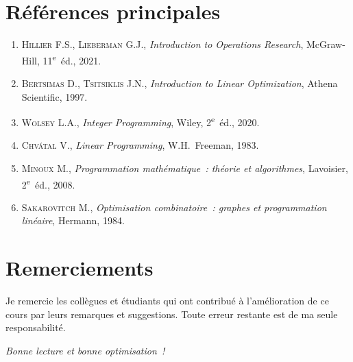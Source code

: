 \section*{R\'ef\'erences principales}

\begin{enumerate}
  \item \textsc{Hillier} F.S., \textsc{Lieberman} G.J.,
        \textit{Introduction to Operations Research}, McGraw-Hill,
        11\textsuperscript{e}~\'ed., 2021.
  \item \textsc{Bertsimas} D., \textsc{Tsitsiklis} J.N.,
        \textit{Introduction to Linear Optimization}, Athena Scientific, 1997.
  \item \textsc{Wolsey} L.A.,
        \textit{Integer Programming}, Wiley, 2\textsuperscript{e}~\'ed., 2020.
  \item \textsc{Chv\'atal} V.,
        \textit{Linear Programming}, W.H.~Freeman, 1983.
  \item \textsc{Minoux} M.,
        \textit{Programmation math\'ematique~: th\'eorie et algorithmes},
        Lavoisier, 2\textsuperscript{e}~\'ed., 2008.
  \item \textsc{Sakarovitch} M.,
        \textit{Optimisation combinatoire~: graphes et programmation lin\'eaire},
        Hermann, 1984.
\end{enumerate}

\section*{Remerciements}

Je remercie les coll\`egues et \'etudiants qui ont contribu\'e \`a l'am\'elioration
de ce cours par leurs remarques et suggestions. Toute erreur restante est de
ma seule responsabilit\'e.

\vfill
\begin{flushright}
\textit{Bonne lecture et bonne optimisation~!}
\end{flushright}
